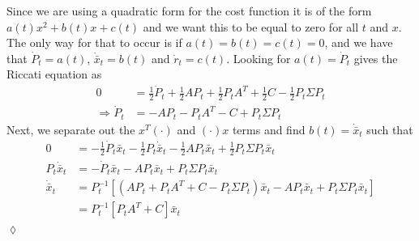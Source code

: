 \begin{example}
Since we are using a quadratic form for the cost function it is of the form $a(t)x^2+b(t)x+c(t)$ and we want this to be equal to zero for all $t$ and $x$. The only way for that to occur is if $a(t)=b(t)=c(t)=0$, and we have that $\dot{P}_t = a(t)$, $\dot{\bar{x}}_t=b(t)$ and $\dot{r}_t=c(t)$. Looking for $a(t) = \dot{P}_t$ gives the Riccati equation as
\begin{align*}
0 &= \frac{1}{2}\dot{P}_t + \frac{1}{2}AP_t + \frac{1}{2}P_tA^T + \frac{1}{2}C - \frac{1}{2}P_t\Sigma P_t \\
\Rightarrow \dot{P}_t &= -AP_t - P_tA^T - C + P_t\Sigma P_t
\end{align*}
Next, we separate out the $x^T(\cdot)$ and $(\cdot)x$ terms and find $b(t) = \dot{\bar{x}}_t$ such that
\begin{align*}
0 &= -\frac{1}{2}\dot{P}_t\bar{x}_t - \frac{1}{2}P_t\dot{\bar{x}}_t - \frac{1}{2}AP_t\bar{x}_t + \frac{1}{2}P_t\Sigma P_t\bar{x}_t \\
P_t\dot{\bar{x}}_t &= -\dot{P}_t\bar{x}_t - AP_t\bar{x}_t + P_t\Sigma P_t\bar{x}_t \\
\dot{\bar{x}}_t &= P_t^{-1}\left[ (AP_t+P_tA^T+C-P_t\Sigma P_t)\bar{x}_t - AP_t\bar{x}_t + P_t\Sigma P_t\bar{x}_t \right] \\
&= P_t^{-1}\left[P_tA^T + C\right] \bar{x}_t
\end{align*}
$\lozenge$
\end{example}

